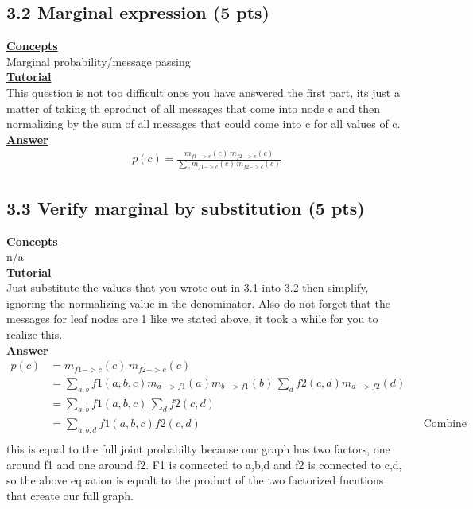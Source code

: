 \documentclass[11pt]{article}
\begin{document}
\subsection{3.2 Marginal expression (5 pts)}
\noindent \textbf{\underline{Concepts}}\\
Marginal probability/message passing\\
\noindent \textbf{\underline{Tutorial}}\\
This question is not too difficult once you have answered the first part, its just a matter of taking th eproduct of all messages that
 come into node c and then normalizing by the sum of all messages that could come into c for all values of c.\\
\noindent \textbf{\underline{Answer}}\\
\begin{align*}
    p(c) = \frac{m_{f1->c}(c)\,m_{f2->c}(c)}{\sum_{c}m_{f1->c}(c)\,m_{f2->c}(c)}
\end{align*}
\subsection{3.3 Verify marginal by substitution (5 pts)}
\noindent \textbf{\underline{Concepts}}\\
n/a\\
\noindent \textbf{\underline{Tutorial}}\\
Just substitute the values that you wrote out in 3.1 into 3.2 then simplify, ignoring the normalizing value in the denominator.  Also
 do not forget that the messages for leaf nodes are 1 like we stated above, it took a while for you to realize this.\\
\noindent \textbf{\underline{Answer}}\\
\begin{align*}
    p(c)    &= m_{f1->c}(c)\,m_{f2->c}(c)\\
            &= \sum_{a,b}f1(a,b,c)m_{a->f1}(a)m_{b->f1}(b)\,\sum_{d}f2(c,d)m_{d->f2}(d)\\
            &= \sum_{a,b}f1(a,b,c)\,\sum_{d}f2(c,d)\\
            &= \sum_{a,b,d}f1(a,b,c)f2(c,d) &&\text{Combine independent factors to single sum}\\
\end{align*}
this is equal to the full joint probabilty because our graph has two factors, one around f1 and one around f2.  F1 is connected to a,b,d
 and f2 is connected to c,d, so the above equation is equalt to the product of the two factorized fucntions that create our full graph.\\
\end{document}
